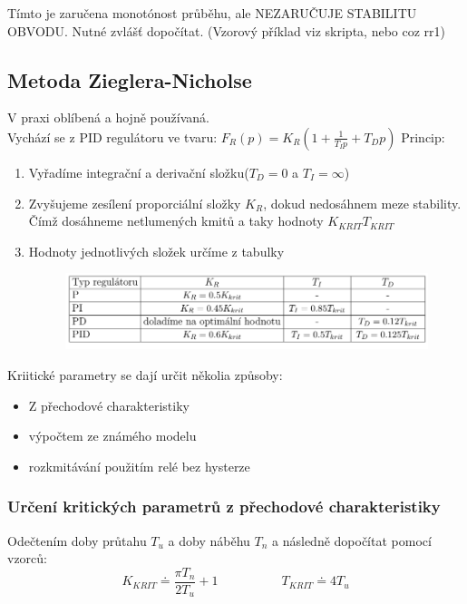 Tímto je zaručena monotónost průběhu, ale NEZARUČUJE STABILITU OBVODU.  Nutné zvlášť dopočítat.
(Vzorový příklad viz skripta, nebo coz rr1)\\
\newpage

\subsection*{Metoda Zieglera-Nicholse}
V praxi oblíbená a hojně používaná.\\
Vychází se z PID regulátoru ve tvaru: $F_R(p) = K_R(1+\frac{1}{T_Ip}+T_Dp)$
Princip:
\begin{enumerate}
    \item Vyřadíme integrační a derivační složku($T_D = 0$ a $T_I = \infty$)
    \item Zvyšujeme zesílení proporciální složky $K_R$, dokud nedosáhnem meze stability. Čímž dosáhneme netlumených kmitů a taky hodnoty $K_{KRIT}$$T_{KRIT}$
    \item Hodnoty jednotlivých složek určíme z tabulky
          \begin{figure}[H]
              \includegraphics*[scale = 1]{images/ZHtab.png}
          \end{figure}
\end{enumerate}
Kriitické parametry se dají určit několia způsoby:
\begin{itemize}
    \item Z přechodové charakteristiky
    \item výpočtem ze známého modelu
    \item rozkmitávání použitím relé bez hysterze
\end{itemize}

\subsubsection*{Určení kritických parametrů z přechodové charakteristiky}
Odečtením doby průtahu $T_u$ a doby náběhu $T_n$ a následně dopočítat pomocí vzorců:
\begin{equation}
    K_{KRIT} \doteq \frac{\pi T_n}{2T_u}+1 \;\;\;\;\;\;\;\;\;\;\;\;\;\;\;\;\;\; T_{KRIT} \doteq 4T_u
\end{equation}

